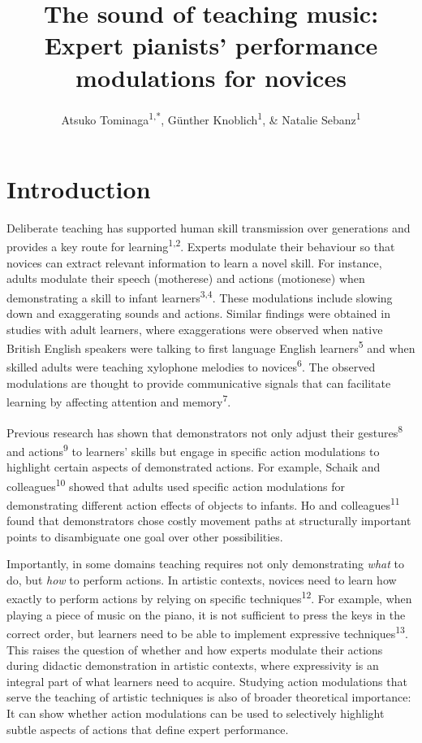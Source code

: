 \documentclass[
  man,floatsintext]{apa6}
\title{The sound of teaching music: Expert pianists' performance modulations for novices}
\author{Atsuko Tominaga\textsuperscript{1,*}, Günther Knoblich\textsuperscript{1}, \& Natalie Sebanz\textsuperscript{1}}
\date{}
\affiliation{\vspace{0.5cm}\textsuperscript{1} Department of Cognitive Science, Central European University, Quellenstraße 51, 1100 Vienna, Austria\\\textsuperscript{*} Corresponding author: \href{mailto:Tominaga_Atsuko@phd.ceu.edu}{\nolinkurl{Tominaga\_Atsuko@phd.ceu.edu}}}
\begin{document}
\maketitle

\hypertarget{introduction}{%
\section{Introduction}\label{introduction}}

Deliberate teaching has supported human skill transmission over generations and provides a key route for learning\textsuperscript{1,2}. Experts modulate their behaviour so that novices can extract relevant information to learn a novel skill. For instance, adults modulate their speech (motherese) and actions (motionese) when demonstrating a skill to infant learners\textsuperscript{3,4}. These modulations include slowing down and exaggerating sounds and actions. Similar findings were obtained in studies with adult learners, where exaggerations were observed when native British English speakers were talking to first language English learners\textsuperscript{5} and when skilled adults were teaching xylophone melodies to novices\textsuperscript{6}. The observed modulations are thought to provide communicative signals that can facilitate learning by affecting attention and memory\textsuperscript{7}.

Previous research has shown that demonstrators not only adjust their gestures\textsuperscript{8} and actions\textsuperscript{9} to learners' skills but engage in specific action modulations to highlight certain aspects of demonstrated actions. For example, Schaik and colleagues\textsuperscript{10} showed that adults used specific action modulations for demonstrating different action effects of objects to infants. Ho and colleagues\textsuperscript{11} found that demonstrators chose costly movement paths at structurally important points to disambiguate one goal over other possibilities.

Importantly, in some domains teaching requires not only demonstrating \emph{what} to do, but \emph{how} to perform actions. In artistic contexts, novices need to learn how exactly to perform actions by relying on specific techniques\textsuperscript{12}. For example, when playing a piece of music on the piano, it is not sufficient to press the keys in the correct order, but learners need to be able to implement expressive techniques\textsuperscript{13}. This raises the question of whether and how experts modulate their actions during didactic demonstration in artistic contexts, where expressivity is an integral part of what learners need to acquire. Studying action modulations that serve the teaching of artistic techniques is also of broader theoretical importance: It can show whether action modulations can be used to selectively highlight subtle aspects of actions that define expert performance.
\end{document}
